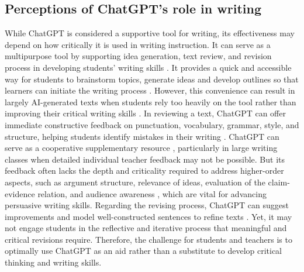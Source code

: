 \documentclass[english]{textolivre}
\begin{document}
\subsection{Perceptions of ChatGPT’s role in writing}\label{sec-organizacao}
While ChatGPT is considered a supportive tool for writing, its effectiveness may depend on how critically it is used in writing instruction. It can serve as a multipurpose tool by supporting idea generation, text review, and revision process in developing students’ writing skills \cite{duong2025, koltovskaia2024, robillos2024}. It provides a quick and accessible way for students to brainstorm topics, generate ideas and develop outlines so that learners can initiate the writing process \cite{xiao2023}. However, this convenience can result in largely AI-generated texts when students rely too heavily on the tool rather than improving their critical writing skills \cite{chia2024}. In reviewing a text, ChatGPT can offer immediate constructive feedback on punctuation, vocabulary, grammar, style, and structure, helping students identify mistakes in their writing \cite{alkamel2024, duong2025, elebyary2024, mahapatra2024}. ChatGPT can serve as a cooperative supplementary resource \cite{teng2024b}, particularly in large writing classes when detailed individual teacher feedback may not be possible. But its feedback often lacks the depth and criticality required to address higher-order aspects, such as argument structure, relevance of ideas, evaluation of the claim-evidence relation, and audience awareness \cite{wang2024}, which are vital for advancing persuasive writing skills. Regarding the revising process, ChatGPT can suggest improvements and model well-constructed sentences to refine texts \cite{al-alami2024, lee2024}. Yet, it may not engage students in the reflective and iterative process that meaningful and critical revisions require. Therefore, the challenge for students and teachers is to optimally use ChatGPT as an aid rather than a substitute to develop critical thinking and writing skills.
\end{document}
